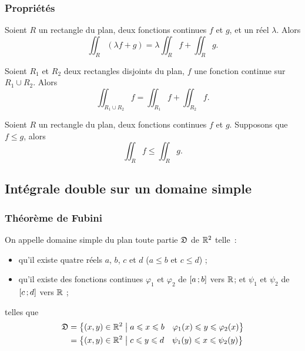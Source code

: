 \subsubsection{Propriétés}

\begin{prop}
  Soient \(R\) un rectangle du plan, deux fonctions continues \(f\) et \(g\), et un réel \(\lambda\). Alors
  \begin{equation}
    \iint_R (\lambda f+g) = \lambda \iint_R f + \iint_R g.
  \end{equation}
\end{prop}
\begin{prop}
  Soient \(R_1\) et \(R_2\) deux rectangles disjoints du plan, \(f\) une fonction continue sur \(R_1 \cup R_2\). Alors
  \begin{equation}
    \iint_{R_1 \cup R_2} f = \iint_{R_1} f + \iint_{R_2} f.
  \end{equation}
\end{prop}
\begin{prop}
  Soient \(R\) un rectangle du plan, deux fonctions continues \(f\) et \(g\). Supposons que \(f \leqslant g\), alors
  \begin{equation}
    \iint_R f \leqslant \iint_R g.
  \end{equation}
\end{prop}

\subsection{Intégrale double sur un domaine simple}

\subsubsection{Théorème de Fubini}

\begin{defdef}
  On appelle domaine simple du plan toute partie \(\mathfrak{D}\) de \(\mathbb{R}^2\) telle~:
  \begin{itemize}
  \item qu'il existe quatre réels \(a\), \(b\), \(c\) et \(d\) (\(a\leqslant b\) et \(c \leqslant d\)) ;
  \item qu'il existe des fonctions continues \(\varphi_1\) et \(\varphi_2\) de \(\left[ a \, ;  b \right]\) vers \(\mathbb{R}\); et \(\psi_1\) et \(\psi_2\) de \(\left[ c \, ;  d \right]\) vers \(\mathbb{R}\) ;
  \end{itemize}
  telles que
  \begin{align}
    \mathfrak{D}&=\left\{(x,y)\in\mathbb{R}^2\mathrel{}\middle|\mathrel{}a\leqslant x\leqslant b \quad \varphi_1(x)\leqslant y\leqslant \varphi_2(x)\right\}\\
    &=\left\{(x,y)\in\mathbb{R}^2\mathrel{}\middle|\mathrel{}c \leqslant y \leqslant d \quad \psi_1(y) \leqslant x \leqslant \psi_2(y)\right\}
  \end{align}
\end{defdef}

